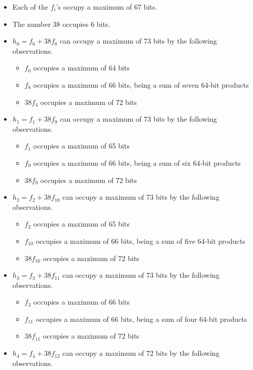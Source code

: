 \documentclass[a4paper, 12pt]{article}
\begin{document}
\begin{itemize}
  \item Each of the $f_i$'s occupy a maximum of 67 bits.
  \item The number 38 occupies 6 bits.
  \item $h_0 = f_0 + 38 f_8$ can occupy a maximum of 73 bits by the following observations.
    \begin{itemize}
      \item $f_0$ occupies a maximum of 64 bits
      \item $f_8$ occupies a maximum of 66 bits, being a sum of seven 64-bit products
      \item $38f_4$ occupies a maximum of 72 bits
    \end{itemize}
  \item $h_1 = f_1 + 38 f_9$ can occupy a maximum of 73 bits by the following observations.
    \begin{itemize}
      \item $f_1$ occupies a maximum of 65 bits
      \item $f_9$ occupies a maximum of 66 bits, being a sum of six 64-bit products
      \item $38f_9$ occupies a maximum of 72 bits
    \end{itemize}
  \item $h_2 = f_2 + 38 f_{10}$ can occupy a maximum of 73 bits by the following observations.
    \begin{itemize}
      \item $f_2$ occupies a maximum of 65 bits
      \item $f_{10}$ occupies a maximum of 66 bits, being a sum of five 64-bit products
      \item $38f_{10}$ occupies a maximum of 72 bits
    \end{itemize}
  \item $h_3 = f_3 + 38 f_{11}$ can occupy a maximum of 73 bits by the following observations.
    \begin{itemize}
      \item $f_3$ occupies a maximum of 66 bits
      \item $f_{11}$ occupies a maximum of 66 bits, being a sum of four 64-bit products
      \item $38f_{11}$ occupies a maximum of 72 bits
    \end{itemize}
  \item $h_4 = f_4 + 38 f_{12}$ can occupy a maximum of 72 bits by the following observations.
    \begin{itemize}

\end{itemize}
\end{itemize}
\end{document}
